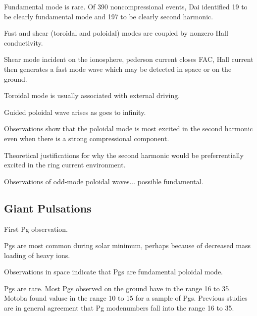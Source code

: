
Fundamental mode is rare. Of 390 noncompressional events, Dai identified 19 to be clearly fundamental mode and 197 to be clearly second harmonic\cite{dai_2015}. 

Fast and shear (toroidal and poloidal) modes are coupled by nonzero Hall conductivity\cite{kato_1956}. 

Shear mode incident on the ionosphere, pederson current closes FAC, Hall current then generates a fast mode wave which may be detected in space or on the ground\cite{tamao_1965}. 

Toroidal mode is usually associated with external driving\cite{chen_1974,southwood_1974}. 

Guided poloidal wave arises as \azm goes to infinity\cite{radoski_1967_poloidal}. 

Observations show that the poloidal mode is most excited in the second harmonic\cite{cummings_1969,hughes_1978,arthur_1981,singer_1982,takahashi_1984,engebretson_1988} even when there is a strong compressional component\cite{takahashi_1987,haerendel_1999,vaivads_2001,sibeck_2012}. 

Theoretical justifications for why the second harmonic would be preferrentially excited in the ring current environment\cite{southwood_1976,chen_1991,cheng_1994,chan_1994}. 

Observations of odd-mode poloidal waves... possible fundamental\cite{yang_2010,eriksson_2005}.

\subsection{Giant Pulsations}

First Pg observation\cite{birkeland_1901}. 

Pgs are most common during solar minimum, perhaps because of decreased mass loading of heavy ions\cite{denton_2011}. 

Observations in space indicate that Pgs are fundamental poloidal mode\cite{kokubun_1980,hillebrand_1982,kokubun_1989,takahashi_1992,glassmeier_1999}. 

Pgs are rare\cite{brekke_1987}. Most Pgs observed on the ground have \azm in the range 16 to 35\cite{takahashi_1992}. Motoba\cite{motoba_2015} found \azm valuse in the range 10 to 15 for a sample of Pgs. Previous studies\cite{rostoker_1979,glassmeier_1980,hillebrand_1982,poulter_1983} are in general agreement that Pg modenumbers fall into the range 16 to 35. 

